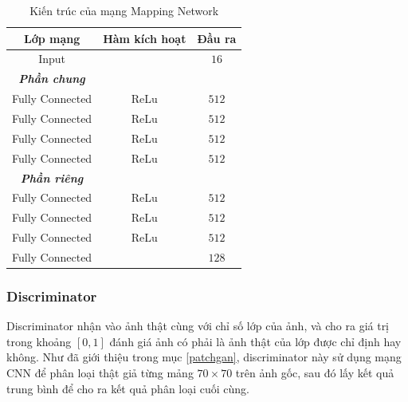 \documentclass[12pt]{extreport}
\begin{document}
\begin{table}[H]
    \centering
    \begin{tabular}{c c c}
        Lớp mạng        & Hàm kích hoạt & Đầu ra  \\
        \hline
        Input           &               & $ 16 $  \\
        \hline
        \textbf{\textit{Phần chung}}              \\
        Fully Connected & ReLu          & $ 512 $ \\
        Fully Connected & ReLu          & $ 512 $ \\
        Fully Connected & ReLu          & $ 512 $ \\
        Fully Connected & ReLu          & $ 512 $ \\
        \hline
        \textbf{\textit{Phần riêng}}              \\
        Fully Connected & ReLu          & $ 512 $ \\
        Fully Connected & ReLu          & $ 512 $ \\
        Fully Connected & ReLu          & $ 512 $ \\
        Fully Connected &               & $ 128 $
    \end{tabular}
    \caption{Kiến trúc của mạng Mapping Network}
\end{table}

\subsubsection{Discriminator}

Discriminator nhận vào ảnh thật cùng với chỉ số lớp của ảnh, và cho ra giá trị trong khoảng $ [0, 1] $ đánh giá ảnh có phải là ảnh thật của lớp được chỉ định hay không. Như đã giới thiệu trong mục \ref{patchgan}, discriminator này sử dụng mạng CNN để phân loại thật giả từng mảng $ 70 \times 70 $ trên ảnh gốc, sau đó lấy kết quả trung bình để cho ra kết quả phân loại cuối cùng.
\end{document}
